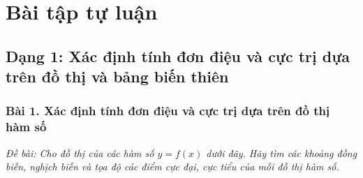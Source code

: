 \documentclass[12pt]{article}
\begin{document}
	\newpage
	
	\section{Bài tập tự luận}
	
	\subsection{Dạng 1: Xác định tính đơn điệu và cực trị dựa trên đồ thị và bảng biến thiên}
	
	\subsubsection{Bài 1. Xác định tính đơn điệu và cực trị dựa trên đồ thị hàm số}
	\textit{Đề bài: Cho đồ thị của các hàm số $y = f(x)$ dưới đây. Hãy tìm các khoảng đồng biến, nghịch biến và tọa độ các điểm cực đại, cực tiểu của mỗi đồ thị hàm số.}
	
\end{document}
